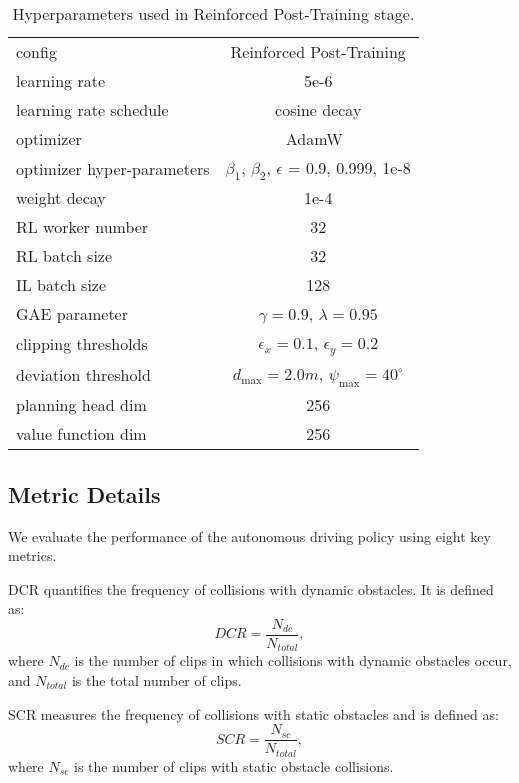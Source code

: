 \begin{table}[h]
\centering
{}
\begin{tabular}{l|c}
config &Reinforced Post-Training \\
\shline
learning rate & 5e-6 \\
learning rate schedule & cosine decay \\
optimizer & AdamW~\cite{adam,Loshchilov2019adamw} \\
optimizer hyper-parameters & $\beta_1$, $\beta_2$, $\epsilon$ = 0.9, 0.999, 1e-8 \\
weight decay & 1e-4 \\
RL worker number & 32 \\
RL batch size & 32 \\
IL batch size & 128 \\
GAE parameter & $\gamma=0.9$, $\lambda=0.95$ \\
clipping thresholds & $\epsilon_x=0.1$, $\epsilon_y=0.2$ \\
deviation threshold  & $d_{\text{max}}=2.0m$, $\psi_{\text{max}}=40^\circ$ \\
planning head dim & 256 \\
value function dim & 256 \\
\end{tabular}
\caption{Hyperparameters used in \thename{} Reinforced Post-Training stage.}
\label{tab:Planning Post-Training stage}    
\end{table}

\subsection{Metric Details}
We evaluate the performance of the autonomous driving policy using eight key metrics.  

 DCR quantifies the frequency of collisions with dynamic obstacles. It is defined as: 
\begin{equation}
DCR = \frac{N_{dc}}{N_{total}},
\end{equation}
where \( N_{dc} \) is the number of clips in which collisions with dynamic obstacles occur, and \( N_{total} \) is the total number of clips.  

 SCR measures the frequency of collisions with static obstacles and is defined as:  
\begin{equation}
SCR = \frac{N_{sc}}{N_{total}},
\end{equation}
where \( N_{sc} \) is the number of clips with static obstacle collisions.  

